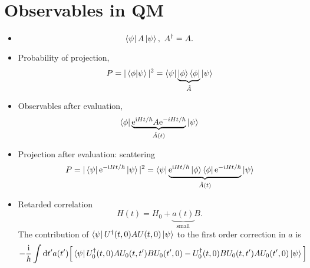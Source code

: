 \section{Observables in QM}
\begin{itemize}
  \item \begin{equation}
    \bra{\psi} A \ket{\psi}, \ A^{\dagger} = A.
  \end{equation}

  \item Probability of projection,
  \begin{equation}
    P = |\bra{\phi}\ket{\psi}|^2 = \bra{\psi} \underbrace{\ket{\phi} \bra{\phi}}_{\hat{A}}\ket{\psi}
  \end{equation}
  
  \item Observables after evaluation,
  \begin{equation}
    \bra{\phi} \underbrace{\mathrm{e}^{\mathrm{i} H t / \hbar} A \mathrm{e}^{- i H t / \hbar}}_{\hat{A}(t)} \ket{\psi}
  \end{equation}

  \item Projection after evaluation: scattering
  \begin{equation}
    P = |\bra{\psi} \mathrm{e}^{- \mathrm{i}  Ht / \hbar}\ket{\psi}|^2 = \bra{\psi} \underbrace{\mathrm{e}^{\mathrm{i} H t / \hbar} \ket{\phi}\bra{\phi} \mathrm{e}^{- i H t / \hbar}}_{\hat{A}(t)} \ket{\psi}
  \end{equation}

  \item Retarded correlation
  \begin{equation}
  H(t) = H_0 + \underbrace{a(t)}_{\text{small}} B.
\end{equation}
  The contribution of $\bra{\psi}U^{\dagger}(t,0) A U(t,0)\ket{\psi}$ to the first order correction in $a$ is
  \begin{equation}
    - \frac{\mathrm{i} }{\hbar} \int \mathrm{d} t' a(t')\Big[ \bra{\psi}U_0^{\dagger}(t,0) A U_0(t,t') B U_0(t',0) - U_0^{\dagger}(t,0) B U_0(t,t') A U_0(t',0)\ket{\psi} \Big] 
  \end{equation}



\end{itemize}



